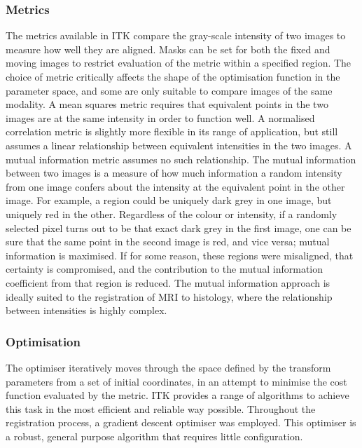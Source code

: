     \subsubsection{Metrics} %
    \label{ssub:metrics}
      The metrics available in ITK compare the gray-scale intensity of two images to measure how well they are aligned. Masks can be set for both the fixed and moving images to restrict evaluation of the metric within a specified region. The choice of metric critically affects the shape of the optimisation function in the parameter space, and some are only suitable to compare images of the same modality. A mean squares metric requires that equivalent points in the two images are at the same intensity in order to function well. A normalised correlation metric is slightly more flexible in its range of application, but still assumes a linear relationship between equivalent intensities in the two images. A mutual information metric assumes no such relationship. The mutual information between two images is a measure of how much information a random intensity from one image confers about the intensity at the equivalent point in the other image. For example, a region could be uniquely dark grey in one image, but uniquely red in the other. Regardless of the colour or intensity, if a randomly selected pixel turns out to be that exact dark grey in the first image, one can be sure that the same point in the second image is red, and vice versa; mutual information is maximised. If for some reason, these regions were misaligned, that certainty is compromised, and the contribution to the mutual information coefficient from that region is reduced. The mutual information approach is ideally suited to the registration of MRI to histology, where the relationship between intensities is highly complex.
  
    \subsubsection{Optimisation} %
    \label{ssub:optimisation}
    The optimiser iteratively moves through the space defined by the transform parameters from a set of initial coordinates, in an attempt to minimise the cost function evaluated by the metric. ITK provides a range of algorithms to achieve this task in the most efficient and reliable way possible. Throughout the registration process, a gradient descent optimiser was employed. This optimiser is a robust, general purpose algorithm that requires little configuration.
  
